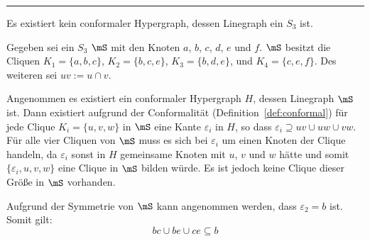 \rule{\linewidth}{1pt}
\clearpage

\begin{Lemma}\label{lem:LineConformalS3}
Es existiert kein conformaler Hypergraph, dessen Linegraph ein $S_3$ ist.
\end{Lemma}

\begin{Proof}
Gegeben sei ein $S_3$ $\mS$ mit den Knoten $a$, $b$, $c$, $d$, $e$ und $f$. $\mS$ besitzt die Cliquen $K_1=\{a,b,c\}$, $K_2=\{b,c,e\}$, $K_3=\{b,d,e\}$, und $K_4=\{c,e,f\}$. Des weiteren sei $uv:=u\cap v$.

{}

Angenommen es existiert ein conformaler Hypergraph $H$, dessen Linegraph $\mS$ ist. Dann existiert aufgrund der Conformalität (Definition~\ref{def:conformal}) für jede Clique $K_i=\{u,v,w\}$ in $\mS$ eine Kante $\varepsilon_i$ in $H$, so dass $\varepsilon_i \supseteq uv \cup uw \cup vw$. Für alle vier Cliquen von $\mS$ muss es sich bei $\varepsilon_i$ um einen Knoten der Clique handeln, da $\varepsilon_i$ sonst in $H$ gemeinsame Knoten mit $u$, $v$ und $w$ hätte und somit $\{\varepsilon_i,u,v,w\}$ eine Clique in $\mS$ bilden würde. Es ist jedoch keine Clique dieser Größe in $\mS$ vorhanden.

Aufgrund der Symmetrie von $\mS$ kann \oBdA angenommen werden, dass $\varepsilon_2=b$ ist. Somit gilt:
\[bc \cup be \cup ce \subseteq b\]


\end{Proof}
